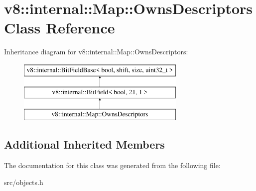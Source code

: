 \hypertarget{classv8_1_1internal_1_1_map_1_1_owns_descriptors}{}\section{v8\+:\+:internal\+:\+:Map\+:\+:Owns\+Descriptors Class Reference}
\label{classv8_1_1internal_1_1_map_1_1_owns_descriptors}
Inheritance diagram for v8\+:\+:internal\+:\+:Map\+:\+:Owns\+Descriptors\+:\begin{figure}[H]
\begin{center}
\leavevmode
\includegraphics[height=3.000000cm]{classv8_1_1internal_1_1_map_1_1_owns_descriptors}
\end{center}
\end{figure}
\subsection*{Additional Inherited Members}


The documentation for this class was generated from the following file\+:\begin{DoxyCompactItemize}
\item 
src/objects.\+h\end{DoxyCompactItemize}

